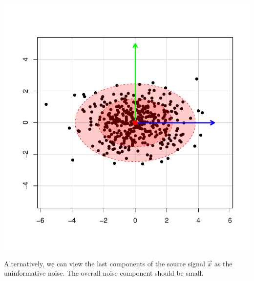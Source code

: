 \documentclass[landscape,footrule]{foils}
\newcommand{\lastline}{\vspace*{-2ex}}
\begin{document}
\begin{center}
\includegraphics[scale=0.45]{rotated-distribution-ii.pdf}
\end{center}\vspace*{-1cm}

Alternatively, we can view the last components of the source signal $\vec{x}$ as the uninformative noise. The overall noise component should be small.\lastline
\end{document}

